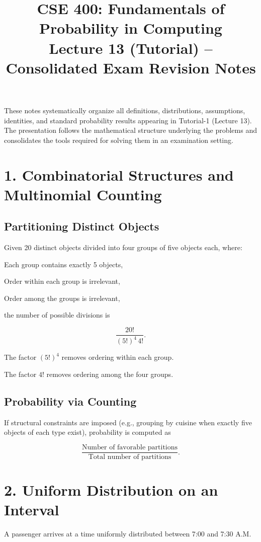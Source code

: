 \documentclass[12pt]{article}
\title{CSE 400: Fundamentals of Probability in Computing\\
Lecture 13 (Tutorial) – Consolidated Exam Revision Notes}
\date{}
\begin{document}
\maketitle

These notes systematically organize all definitions, distributions, assumptions, identities, and standard probability results appearing in Tutorial-1 (Lecture 13). The presentation follows the mathematical structure underlying the problems and consolidates the tools required for solving them in an examination setting.

\section*{1. Combinatorial Structures and Multinomial Counting}

\subsection*{Partitioning Distinct Objects}

Given 20 distinct objects divided into four groups of five objects each, where:

Each group contains exactly 5 objects,

Order within each group is irrelevant,

Order among the groups is irrelevant,

the number of possible divisions is

\[
\frac{20!}{(5!)^4 \, 4!}.
\]

The factor $(5!)^4$ removes ordering within each group.

The factor $4!$ removes ordering among the four groups.

\subsection*{Probability via Counting}

If structural constraints are imposed (e.g., grouping by cuisine when exactly five objects of each type exist), probability is computed as

\[
\frac{\text{Number of favorable partitions}}{\text{Total number of partitions}}.
\]

\section*{2. Uniform Distribution on an Interval}

A passenger arrives at a time uniformly distributed between 7:00 and 7:30 A.M.
\end{document}
